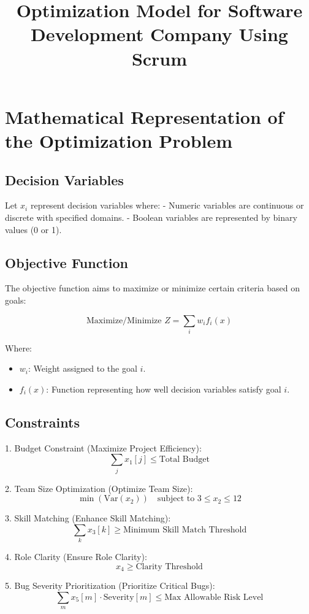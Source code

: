 \documentclass{article}
\title{Optimization Model for Software Development Company Using Scrum}
\author{}
\date{}
\begin{document}
\maketitle

\section*{Mathematical Representation of the Optimization Problem}

\subsection*{Decision Variables}
Let \( x_i \) represent decision variables where:
- Numeric variables are continuous or discrete with specified domains.
- Boolean variables are represented by binary values (0 or 1).

\subsection*{Objective Function}
The objective function aims to maximize or minimize certain criteria based on goals:

\[
\text{Maximize/Minimize } Z = \sum_{i} w_i f_i(x)
\]

Where:
\begin{itemize}
    \item \( w_i \): Weight assigned to the goal \( i \).
    \item \( f_i(x) \): Function representing how well decision variables satisfy goal \( i \).
\end{itemize}

\subsection*{Constraints}

1. Budget Constraint (Maximize Project Efficiency):
   \[
   \sum_{j} x_1[j] \leq \text{Total Budget}
   \]

2. Team Size Optimization (Optimize Team Size):
   \[
   \min(\text{Var}(x_2)) \quad \text{subject to } 3 \leq x_2 \leq 12
   \]

3. Skill Matching (Enhance Skill Matching):
   \[
   \sum_{k} x_3[k] \geq \text{Minimum Skill Match Threshold}
   \]

4. Role Clarity (Ensure Role Clarity):
   \[
   x_4 \geq \text{Clarity Threshold}
   \]

5. Bug Severity Prioritization (Prioritize Critical Bugs):
   \[
   \sum_{m} x_5[m] \cdot \text{Severity}[m] \leq \text{Max Allowable Risk Level}
   \]
\end{document}
